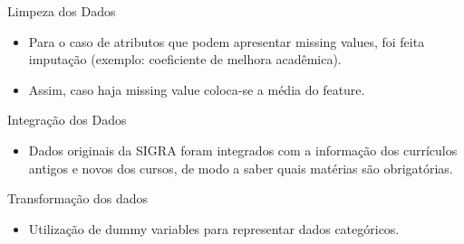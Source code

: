 \begin{frame}{Limpeza dos Dados}
\begin{itemize}[itemsep=3ex]
    \item Para o caso de atributos que podem apresentar missing values, foi feita
        imputação (exemplo: coeficiente de melhora acadêmica).
    \item Assim, caso haja missing value coloca-se a média do feature. 
\end{itemize}
\end{frame}

\begin{frame}{Integração dos Dados}
\begin{itemize}[itemsep=3ex]
    \item Dados originais da SIGRA foram integrados com a informação dos currículos
        antigos e novos dos cursos, de modo a saber quais matérias são obrigatórias. 
\end{itemize}
\end{frame}

\begin{frame}{Transformação dos dados}
\begin{itemize}[itemsep=3ex]
    \item Utilização de dummy variables para representar dados categóricos.  
\end{itemize}
\end{frame}

